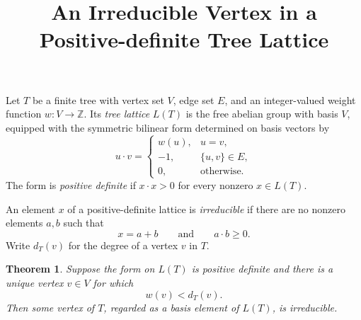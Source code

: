 \documentclass[11pt]{article}
\newtheorem{theorem}{Theorem}
\begin{document}
\title{An Irreducible Vertex in a Positive-definite Tree Lattice}
\date{}
\maketitle

Let $T$ be a finite tree with vertex set $V$, edge set $E$, and an
integer-valued weight function $w:V\to\mathbb Z$.  Its \emph{tree lattice}
$L(T)$ is the free abelian group with basis $V$, equipped with the symmetric
bilinear form determined on basis vectors by
\[
 u\mathbin{\cdot}v=
 \begin{cases}
   w(u),&u=v,\\
   -1,&\{u,v\}\in E,\\
   0,&\text{otherwise}.
 \end{cases}
\]
The form is \emph{positive definite} if $x\mathbin{\cdot}x>0$ for every
nonzero $x\in L(T)$.

An element $x$ of a positive-definite lattice is \emph{irreducible} if there
are no nonzero elements $a,b$ such that
\[
 x=a+b \qquad\text{and}\qquad a\mathbin{\cdot}b\geq 0.
\]
Write $d_T(v)$ for the degree of a vertex $v$ in $T$.

\begin{theorem}
Suppose the form on $L(T)$ is positive definite and there is a unique vertex
$v\in V$ for which
\[
 w(v)<d_T(v).
\]
Then some vertex of $T$, regarded as a basis element of $L(T)$, is
irreducible.
\end{theorem}
\end{document}
